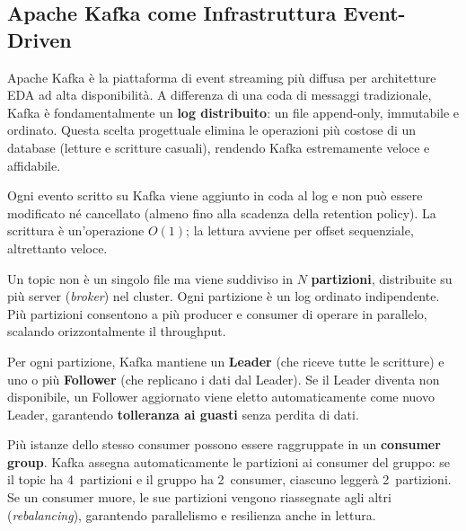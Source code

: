 \documentclass[12pt,a4paper]{report}
\begin{document}
\subsection{Apache Kafka come Infrastruttura Event-Driven}

Apache Kafka è la piattaforma di event streaming più diffusa per architetture
EDA ad alta disponibilità. A differenza di una coda di messaggi tradizionale,
Kafka è fondamentalmente un \textbf{log distribuito}: un file append-only,
immutabile e ordinato. Questa scelta progettuale elimina le operazioni più
costose di un database (letture e scritture casuali), rendendo Kafka
estremamente veloce e affidabile.

\begin{description}[style=nextline, leftmargin=1.5cm]
  \item[\textsf{Log Immutabile}]
    Ogni evento scritto su Kafka viene aggiunto in coda al log e non può essere
    modificato né cancellato (almeno fino alla scadenza della retention policy).
    La scrittura è un'operazione $O(1)$; la lettura avviene per offset sequenziale,
    altrettanto veloce.

  \item[\textsf{Partizioni e Scalabilità}]
    Un topic non è un singolo file ma viene suddiviso in $N$
    \textbf{partizioni}, distribuite su più server (\textit{broker}) nel cluster.
    Ogni partizione è un log ordinato indipendente. Più partizioni consentono a
    più producer e consumer di operare in parallelo, scalando orizzontalmente
    il throughput.

  \item[\textsf{Replicazione Leader/Follower}]
    Per ogni partizione, Kafka mantiene un \textbf{Leader} (che riceve tutte le
    scritture) e uno o più \textbf{Follower} (che replicano i dati dal Leader).
    Se il Leader diventa non disponibile, un Follower aggiornato viene eletto
    automaticamente come nuovo Leader, garantendo \textbf{tolleranza ai guasti}
    senza perdita di dati.

  \item[\textsf{Consumer Group}]
    Più istanze dello stesso consumer possono essere raggruppate in un
    \textbf{consumer group}. Kafka assegna automaticamente le partizioni ai
    consumer del gruppo: se il topic ha 4~partizioni e il gruppo ha 2~consumer,
    ciascuno leggerà 2~partizioni. Se un consumer muore, le sue partizioni
    vengono riassegnate agli altri (\textit{rebalancing}), garantendo
    parallelismo e resilienza anche in lettura.


\end{description}
\end{document}
